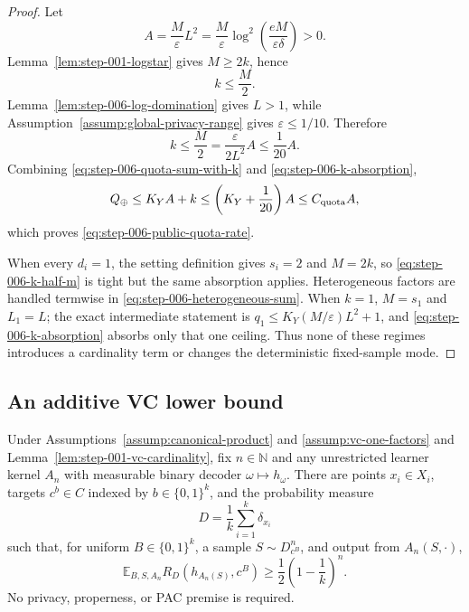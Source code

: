 \begin{proof}
Let
\begin{equation}\label{eq:step-006-public-scale}
A=\frac{M}{\varepsilon}L^2
=\frac{M}{\varepsilon}
\log^2\!\left(\frac{eM}{\varepsilon\delta}\right)>0.
\end{equation}
Lemma~\ref{lem:step-001-logstar} gives \(M\ge2k\), hence
\begin{equation}\label{eq:step-006-k-half-m}
k\le\frac M2.
\end{equation}
Lemma~\ref{lem:step-006-log-domination} gives \(L>1\), while
Assumption~\ref{assump:global-privacy-range} gives
\(\varepsilon\le1/10\).  Therefore
\begin{equation}\label{eq:step-006-k-absorption}
k\le\frac M2
=\frac{\varepsilon}{2L^2}A
\le\frac1{20}A.
\end{equation}
Combining \eqref{eq:step-006-quota-sum-with-k} and
\eqref{eq:step-006-k-absorption},
\begin{equation}\label{eq:step-006-final-absorption}
Q_\oplus
\le K_YA+k
\le\left(K_Y+\frac1{20}\right)A
\le C_{\rm quota}A,
\end{equation}
which proves \eqref{eq:step-006-public-quota-rate}.

When every \(d_i=1\), the setting definition gives \(s_i=2\) and
\(M=2k\), so \eqref{eq:step-006-k-half-m} is tight but the same
absorption applies.  Heterogeneous factors are handled termwise in
\eqref{eq:step-006-heterogeneous-sum}.  When \(k=1\), \(M=s_1\) and
\(L_1=L\); the exact intermediate statement is
\(q_1\le K_Y(M/\varepsilon)L^2+1\), and
\eqref{eq:step-006-k-absorption} absorbs only that one ceiling.  Thus none
of these regimes introduces a cardinality term or changes the deterministic
fixed-sample mode.
\end{proof}

\subsection{An additive VC lower bound}
\label{app:step-007}

\begin{lemma}
\label{lem:step-007-unseen-labels}
Under Assumptions~\ref{assump:canonical-product} and
\ref{assump:vc-one-factors} and
Lemma~\ref{lem:step-001-vc-cardinality}, fix \(n\in\mathbb N\) and any
unrestricted learner kernel \(A_n\) with measurable binary decoder
\(\omega\mapsto h_\omega\).  There are points \(x_i\in X_i\), targets
\(c^b\in C\) indexed by \(b\in\{0,1\}^k\), and the probability measure
\begin{equation}\label{eq:step-007-hard-distribution}
D=\frac1k\sum_{i=1}^k\delta_{x_i}
\end{equation}
such that, for uniform \(B\in\{0,1\}^k\), a sample
\(S\sim D_{c^B}^n\), and output from \(A_n(S,\cdot)\),
\begin{equation}\label{eq:step-007-unseen-risk}
\mathbb E_{B,S,A_n}R_D(h_{A_n(S)},c^B)
\ge\frac12\left(1-\frac1k\right)^n.
\end{equation}
No privacy, properness, or PAC premise is required.
\end{lemma}


